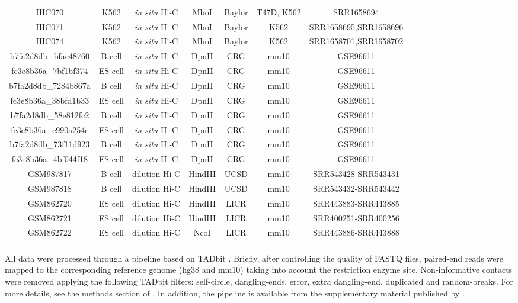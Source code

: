 \documentclass{bioinfo}
\begin{document}
\begin{methods}
\begin{table}
{\begin{tabular}{ccccccc}
HIC070  & K562 & \textit{in situ} Hi-C &
  MboI & Baylor & T47D, K562 &    SRR1658694 \\
HIC071  & K562 & \textit{in situ} Hi-C &
  MboI & Baylor & K562 & SRR1658695,SRR1658696 \\
HIC074  & K562 & \textit{in situ} Hi-C &
  MboI & Baylor & K562 & SRR1658701,SRR1658702 \\
b7fa2d8db\_bfac48760 & B cell  & \textit{in situ} Hi-C &
  DpnII & CRG & mm10 & GSE96611 \\
fc3e8b36a\_7bf1bf374 & ES cell & \textit{in situ} Hi-C &
  DpnII & CRG & mm10 & GSE96611 \\
b7fa2d8db\_7284b867a & B cell  & \textit{in situ} Hi-C &
  DpnII & CRG & mm10 & GSE96611 \\
fc3e8b36a\_38bfd1b33 & ES cell & \textit{in situ} Hi-C &
  DpnII & CRG & mm10 & GSE96611 \\
b7fa2d8db\_58e812fc2 & B cell  & \textit{in situ} Hi-C &
  DpnII & CRG & mm10 & GSE96611 \\
fc3e8b36a\_c990a254e & ES cell & \textit{in situ} Hi-C &
  DpnII & CRG & mm10 & GSE96611 \\
b7fa2d8db\_73f11d923 & B cell  & \textit{in situ} Hi-C &
  DpnII & CRG & mm10 & GSE96611 \\
fc3e8b36a\_4bf044f18 & ES cell & \textit{in situ} Hi-C &
  DpnII & CRG & mm10 & GSE96611 \\
GSM987817 & B cell  & dilution Hi-C &
  HindIII & UCSD & mm10 & SRR543428-SRR543431 \\
GSM987818 & B cell  & dilution Hi-C &
  HindIII & UCSD & mm10 & SRR543432-SRR543442 \\
GSM862720 & ES cell & dilution Hi-C &
  HindIII & LICR & mm10 & SRR443883-SRR443885 \\
GSM862721 & ES cell & dilution Hi-C &
  HindIII & LICR & mm10 & SRR400251-SRR400256 \\
GSM862722 & ES cell & dilution Hi-C &
  NcoI    & LICR & mm10 & SRR443886-SRR443888 \\
  \botrule
\end{tabular}}{}
\end{table}


All data were processed through a pipeline based on TADbit
\citep{serra2016structural}. Briefly, after controlling the quality of
FASTQ files, paired-end reads were mapped to the corresponding reference
genome (hg38 and mm10) taking into account the restriction enzyme site.
Non-informative contacts were removed applying the following TADbit
filters: self-circle, dangling-ends, error, extra dangling-end, duplicated
and random-breaks. For more details, see the methods section of
\cite{stadhouders2017transcription}. In addition, the pipeline is
available from the supplementary material published by
\cite{quilez2017managing}.


\end{methods}
\end{document}
